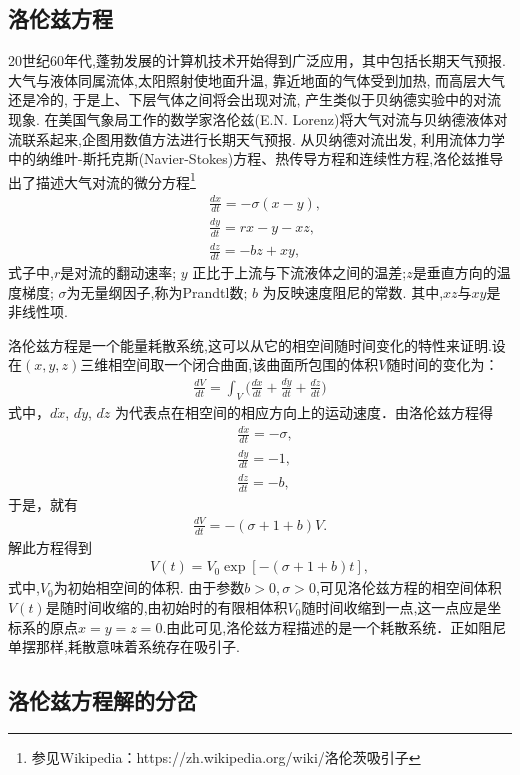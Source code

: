 \subsection{洛伦兹方程}

20世纪60年代,蓬勃发展的计算机技术开始得到广泛应用，其中包括长期天气预报. 大气与液体同属流体,太阳照射使地面升温, 靠近地面的气体受到加热, 而高层大气还是冷的, 于是上、下层气体之间将会出现对流, 产生类似于贝纳德实验中的对流现象. 在美国气象局工作的数学家洛伦兹(E.N. Lorenz)将大气对流与贝纳德液体对流联系起来,企图用数值方法进行长期天气预报. 从贝纳德对流出发, 利用流体力学中的纳维叶-斯托克斯(Navier-Stokes)方程、热传导方程和连续性方程,洛伦兹推导出了描述大气对流的微分方程\footnote{参见Wikipedia：https://zh.wikipedia.org/wiki/洛伦茨吸引子}
\begin{align}
&\frac{dx}{dt}=-\sigma (x-y),\\
&\frac{dy}{dt}=rx-y-xz,\\
&\frac{dz}{dt}=-bz+xy,
\end{align}
式子中,$r$是对流的翻动速率; $y$ 正比于上流与下流液体之间的温差;$z$是垂直方向的温度梯度; $\sigma$为无量纲因子,称为Prandtl数; $b$ 为反映速度阻尼的常数. 其中,$xz$与$xy$是非线性项.

洛伦兹方程是一个能量耗散系统,这可以从它的相空间随时间变化的特性来证明.设在$(x,y, z)$三维相空间取一个闭合曲面,该曲面所包围的体积$V$随时间的变化为：
\begin{align}
\frac{dV}{dt}=\int_V \Big(\frac{d\dot{x}}{dt}+\frac{d\dot{y}}{dt}+\frac{d\dot{z}}{dt}\Big)
\end{align}
式中，$d\dot{x}$, $d\dot{y}$, $d\dot{z}$ 为代表点在相空间的相应方向上的运动速度．由洛伦兹方程得
\begin{align}
&\frac{d\dot{x}}{dt}=-\sigma,\\
&\frac{d\dot{y}}{dt}=-1,\\
&\frac{d\dot{z}}{dt}=-b,
\end{align}
于是，就有
\begin{align}
\frac{dV}{dt}=-(\sigma+1+b)V.
\end{align}
解此方程得到
\begin{align}
V(t)=V_0\exp[-(\sigma+1+b)t],
\end{align}
式中,$V_0$为初始相空间的体积. 由于参数$b>0,\sigma>0$,可见洛伦兹方程的相空间体积$V(t)$是随时间收缩的,由初始时的有限相体积$V_0$随时间收缩到一点,这一点应是坐标系的原点$x=y=z=0$.由此可见,洛伦兹方程描述的是一个耗散系统．正如阻尼单摆那样,耗散意味着系统存在吸引子.

\subsection{洛伦兹方程解的分岔}

